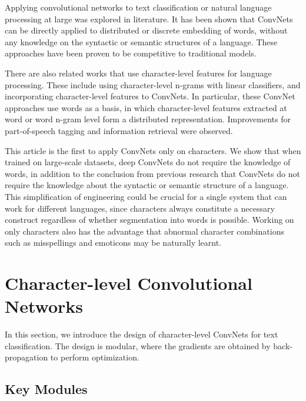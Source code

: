 Applying convolutional networks to text classification or natural language processing at large was explored in literature. It has been shown that ConvNets can be directly applied to distributed\cite{SG14}\cite{K14} or discrete\cite{JZ14} embedding of words, without any knowledge on the syntactic or semantic structures of a language. These approaches have been proven to be competitive to traditional models.

There are also related works that use character-level features for language processing. These include using character-level n-grams with linear classifiers\cite{KKHS07}, and incorporating character-level features to ConvNets\cite{SZ14}\cite{SHGDM14}. In particular, these ConvNet approaches use words as a basis, in which character-level features extracted at word\cite{SZ14} or word n-gram\cite{SHGDM14} level form a distributed representation. Improvements for part-of-speech tagging and information retrieval were observed.

This article is the first to apply ConvNets only on characters. We show that when trained on large-scale datasets, deep ConvNets do not require the knowledge of words, in addition to the conclusion from previous research that ConvNets do not require the knowledge about the syntactic or semantic structure of a language. This simplification of engineering could be crucial for a single system that can work for different languages, since characters always constitute a necessary construct regardless of whether segmentation into words is possible. Working on only characters also has the advantage that abnormal character combinations such as misspellings and emoticons may be naturally learnt.

\section{Character-level Convolutional Networks}

In this section, we introduce the design of character-level ConvNets for text classification. The design is modular, where the gradients are obtained by back-propagation\cite{RHW86} to perform optimization.

\subsection{Key Modules}

